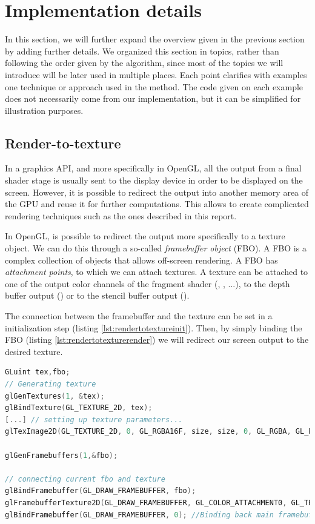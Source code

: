 \section{Implementation details}
In this section, we will further expand the overview given in the previous section by adding further details. We organized this section in topics, rather than following the order given by the algorithm, since most of the topics we will introduce will be later used in multiple places. Each point clarifies with examples one technique or approach used in the method. The code given on each example does not necessarily come from our implementation, but it can be simplified for illustration purposes.

\subsection{Render-to-texture}
\label{sec:rendertotexture}
In a graphics API, and more specifically in OpenGL, all the output from a final shader stage is usually sent to the display device in order to be displayed on the screen. However, it is possible to redirect the output into another memory area of the GPU and reuse it for further computations. This allows to create complicated rendering techniques such as the ones described in this report. 

In OpenGL, is possible to redirect the output more specifically to a texture object. We can do this through a so-called \emph{framebuffer object} (FBO). A FBO is a complex collection of objects that allows off-screen rendering. A FBO has \emph{attachment points}, to which we can attach textures. A texture can be attached to one of the output color channels of the fragment shader (, , ...), to the depth buffer output () or to the stencil buffer output ().

The connection between the framebuffer and the texture can be set in a initialization step (listing \ref{lst:rendertotextureinit}). Then, by simply binding the FBO (listing \ref{lst:rendertotexturerender}) we will redirect our screen output to the desired texture.

\begin{lstlisting}[language=C++,label=lst:rendertotextureinit,caption={Render to texture example, initilalization phase. Note the call to \gl{glFramebufferTexture2D}}]
GLuint tex,fbo;
// Generating texture
glGenTextures(1, &tex);
glBindTexture(GL_TEXTURE_2D, tex);
[...] // setting up texture parameters...
glTexImage2D(GL_TEXTURE_2D, 0, GL_RGBA16F, size, size, 0, GL_RGBA, GL_FLOAT, 0);

glGenFramebuffers(1,&fbo);

// connecting current fbo and texture
glBindFramebuffer(GL_DRAW_FRAMEBUFFER, fbo);
glFramebufferTexture2D(GL_DRAW_FRAMEBUFFER, GL_COLOR_ATTACHMENT0, GL_TEXTURE_2D, tex, 0);
glBindFramebuffer(GL_DRAW_FRAMEBUFFER, 0); //Binding back main framebuffer
\end{lstlisting}

